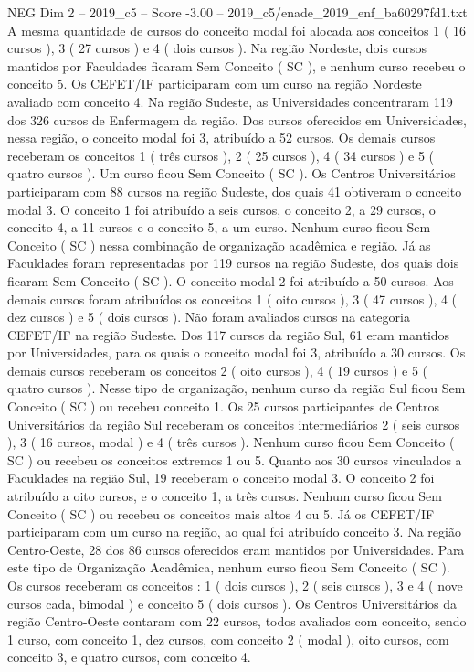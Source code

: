 \begin{textsample}{NEG Dim 2 – 2019\_c5 – Score -3.00 – 2019\_c5/enade\_2019\_enf\_ba60297fd1.txt}
A mesma quantidade de cursos do conceito modal foi alocada aos conceitos 1 ( 16 cursos ), 3 ( 27 cursos ) e 4 ( dois cursos ).
Na região Nordeste, dois cursos mantidos por Faculdades ficaram Sem Conceito ( SC ), e nenhum curso recebeu o conceito 5.
Os CEFET/IF participaram com um curso na região Nordeste avaliado com conceito 4.
Na região Sudeste, as Universidades concentraram 119 dos 326 cursos de Enfermagem da região.
Dos cursos oferecidos em Universidades, nessa região, o conceito modal foi 3, atribuído a 52 cursos.
Os demais cursos receberam os conceitos 1 ( três cursos ), 2 ( 25 cursos ), 4 ( 34 cursos ) e 5 ( quatro cursos ).
Um curso ficou Sem Conceito ( SC ).
Os Centros Universitários participaram com 88 cursos na região Sudeste, dos quais 41 obtiveram o conceito modal 3.
O conceito 1 foi atribuído a seis cursos, o conceito 2, a 29 cursos, o conceito 4, a 11 cursos e o conceito 5, a um curso.
Nenhum curso ficou Sem Conceito ( SC ) nessa combinação de organização acadêmica e região.
Já as Faculdades foram representadas por 119 cursos na região Sudeste, dos quais dois ficaram Sem Conceito ( SC ).
O conceito modal 2 foi atribuído a 50 cursos.
Aos demais cursos foram atribuídos os conceitos 1 ( oito cursos ), 3 ( 47 cursos ), 4 ( dez cursos ) e 5 ( dois cursos ).
Não foram avaliados cursos na categoria CEFET/IF na região Sudeste.
Dos 117 cursos da região Sul, 61 eram mantidos por Universidades, para os quais o conceito modal foi 3, atribuído a 30 cursos.
Os demais cursos receberam os conceitos 2 ( oito cursos ), 4 ( 19 cursos ) e 5 ( quatro cursos ).
Nesse tipo de organização, nenhum curso da região Sul ficou Sem Conceito ( SC ) ou recebeu conceito 1.
Os 25 cursos participantes de Centros Universitários da região Sul receberam os conceitos intermediários 2 ( seis cursos ), 3 ( 16 cursos, modal ) e 4 ( três cursos ).
Nenhum curso ficou Sem Conceito ( SC ) ou recebeu os conceitos extremos 1 ou 5.
Quanto aos 30 cursos vinculados a Faculdades na região Sul, 19 receberam o conceito modal 3.
O conceito 2 foi atribuído a oito cursos, e o conceito 1, a três cursos.
Nenhum curso ficou Sem Conceito ( SC ) ou recebeu os conceitos mais altos 4 ou 5.
Já os CEFET/IF participaram com um curso na região, ao qual foi atribuído conceito 3.
Na região Centro-Oeste, 28 dos 86 cursos oferecidos eram mantidos por Universidades.
Para este tipo de Organização Acadêmica, nenhum curso ficou Sem Conceito ( SC ).
Os cursos receberam os conceitos : 1 ( dois cursos ), 2 ( seis cursos ), 3 e 4 ( nove cursos cada, bimodal ) e conceito 5 ( dois cursos ).
Os Centros Universitários da região Centro-Oeste contaram com 22 cursos, todos avaliados com conceito, sendo 1 curso, com conceito 1, dez cursos, com conceito 2 ( modal ), oito cursos, com conceito 3, e quatro cursos, com conceito 4.

\end{textsample}

